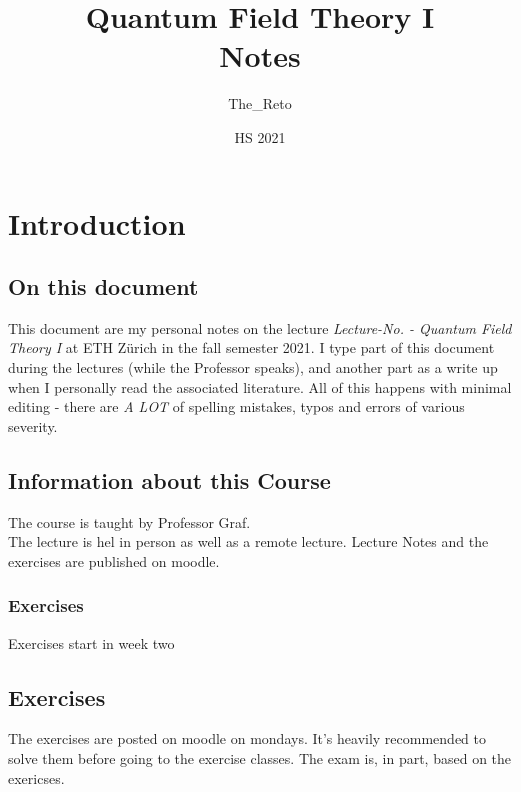 \documentclass{report}
\title{Quantum Field Theory I\\
\large Notes}
\author{The\_Reto}
\date{HS 2021}
\begin{document}
\maketitle


\chapter*{Introduction}
\section*{On this document}
This document are my personal notes on the lecture \emph{Lecture-No. - Quantum Field Theory I} at ETH Zürich in the fall semester 2021. 
I type part of this document during the lectures (while the Professor speaks), and another part as a write up when I personally read the associated literature. All of this happens with minimal editing - there are \emph{A LOT} of spelling mistakes, typos and errors of various severity.
\section*{Information about this Course}
The course is taught by Professor Graf.\\
The lecture is hel in person as well as a remote lecture. Lecture Notes and the exercises are published on moodle.
\subsection*{Exercises}
Exercises start in week two
\section*{Exercises}
The exercises are posted on moodle on mondays. It's heavily recommended to solve them before going to the exercise classes. The exam is, in part, based on the exericses. 
\end{document}
